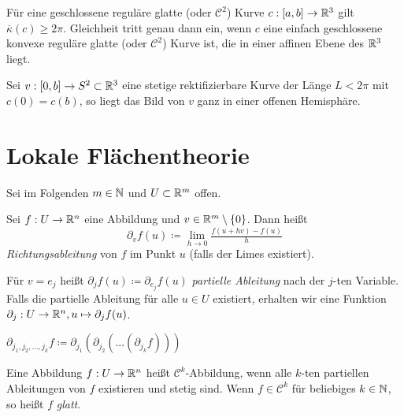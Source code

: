 \documentclass{cheat-sheet}
\begin{document}
\begin{satz}[Fenchel]
  Für eine geschlossene reguläre glatte (oder $\mathcal{C}^2$) Kurve $c : \left[ a, b \right] \to \mathbb{R}^3$ gilt $\overline\kappa(c) \geq 2 \pi$. Gleichheit tritt genau dann ein, wenn $c$ eine einfach geschlossene konvexe reguläre glatte (oder $\mathcal{C}^2$) Kurve ist, die in einer affinen Ebene des $\mathbb{R}^3$ liegt.
\end{satz}

\begin{samepage}

\begin{satz}
  Sei $v : [0, b] \to S^2 \subset \mathbb{R}^3$ eine stetige rektifizierbare Kurve der Länge $L < 2 \pi$
mit $c(0) = c(b)$, so liegt das Bild von $v$ ganz in einer offenen Hemisphäre.
\end{satz}


\section{Lokale Flächentheorie}


\end{samepage}

\begin{nota}
  Sei im Folgenden $m \in \mathbb{N}$ und $U \subset \mathbb{R}^m$ offen.
\end{nota}

\begin{defn}
  Sei $f : U \to \mathbb{R}^n$ eine Abbildung und $v \in \mathbb{R}^m \setminus \{ 0 \}$. Dann heißt
  \[ \partial_v f(u) \coloneqq \lim_{h \to 0} \tfrac{f(u + hv) - f(u)}{ h } \]
  \emph{Richtungsableitung} von $f$ im Punkt $u$ (falls der Limes existiert).
\end{defn}
\begin{defn}
  Für $v = e_j$ heißt $\partial_j f(u) \coloneqq \partial_{e_j} f(u)$ \emph{partielle Ableitung} nach der $j$-ten Variable. Falls die partielle Ableitung für alle $u \in U$ existiert, erhalten wir eine Funktion $\partial_j : U \to \mathbb{R}^n, u \mapsto \partial_j f(u)$.
\end{defn}

\begin{nota}
  $\partial_{j_1, j_2, ..., j_k} f \coloneqq \partial_{j_1} ( \partial_{j_2} ( ... ( \partial_{j_k} f) ) )$
\end{nota}

\begin{defn}
  Eine Abbildung $f : U \to \mathbb{R}^n$ heißt $\mathcal{C}^k$-Abbildung, wenn alle $k$-ten partiellen Ableitungen von $f$ existieren und stetig sind. Wenn $f \in \mathcal{C}^k$ für beliebiges $k \in \mathbb{N}$, so heißt $f$ \emph{glatt}.
\end{defn}
\end{document}
